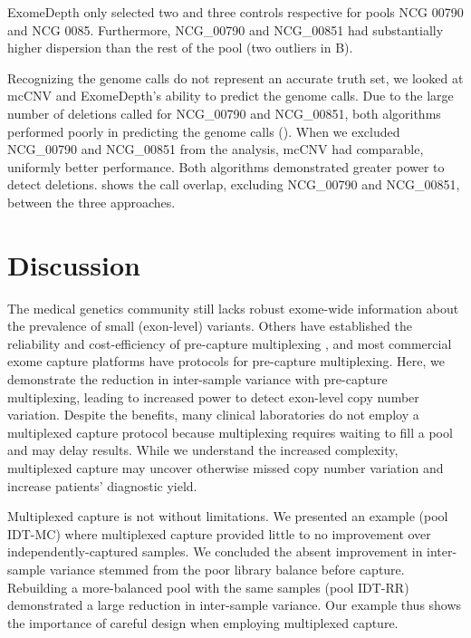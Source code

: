 \documentclass{bmcart}\usepackage[]{graphicx}\usepackage[]{color}
\begin{document}
ExomeDepth only selected two and three controls respective for pools NCG 00790 and NCG 0085.
Furthermore, NCG\_00790 and NCG\_00851 had substantially higher dispersion than the rest of the pool (two outliers in B).

Recognizing the genome calls do not represent an accurate truth set, we looked at mcCNV and ExomeDepth's ability to predict the genome calls.
Due to the large number of deletions called for NCG\_00790 and NCG\_00851, both algorithms performed poorly in predicting the genome calls ().
When we excluded NCG\_00790 and NCG\_00851 from the analysis, mcCNV had comparable, uniformly better performance.
Both algorithms demonstrated greater power to detect deletions.
 shows the call overlap, excluding NCG\_00790 and NCG\_00851, between the three approaches.


\section{Discussion}

The medical genetics community still lacks robust exome-wide information about the prevalence of small (exon-level) variants.
Others have established the reliability and cost-efficiency of pre-capture multiplexing \cite{ramos:2012aa,wesolowska:2011aa,shearer:2012aa,neiman:2012aa,rohland:2012aa}, and most commercial exome capture platforms have protocols for pre-capture multiplexing.
Here, we demonstrate the reduction in inter-sample variance with pre-capture multiplexing, leading to increased power to detect exon-level copy number variation.
Despite the benefits, many clinical laboratories do not employ a multiplexed capture protocol because multiplexing requires waiting to fill a pool and may delay results.
While we understand the increased complexity, multiplexed capture may uncover otherwise missed copy number variation and increase patients' diagnostic yield.

Multiplexed capture is not without limitations.
We presented an example (pool IDT-MC) where multiplexed capture provided little to no improvement over independently-captured samples.
We concluded the absent improvement in inter-sample variance stemmed from the poor library balance before capture.
Rebuilding a more-balanced pool with the same samples (pool IDT-RR) demonstrated a large reduction in inter-sample variance.
Our example thus shows the importance of careful design when employing multiplexed capture.
\end{document}

